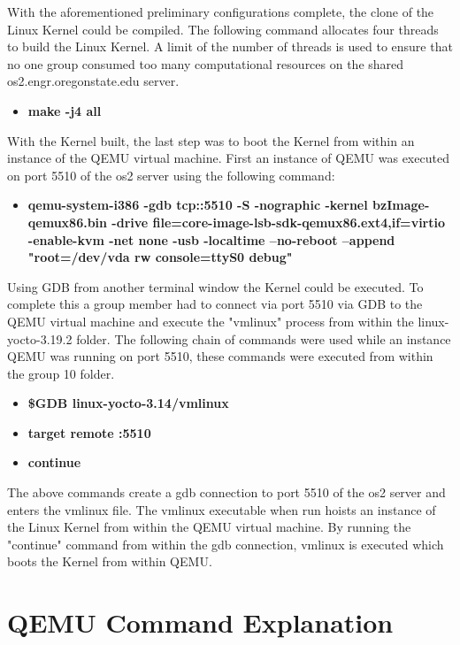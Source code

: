 \documentclass[10pt,onecolumn,draftclsnofoot]{IEEEtran} %
\begin{document}
\begin{singlespace}
 \normalfont \indent With the aforementioned preliminary configurations complete, the clone of the Linux Kernel could be compiled. The following command allocates four threads to build the Linux Kernel. A limit of the number of threads is used to ensure that no one group consumed too many computational resources on the shared os2.engr.oregonstate.edu server.
  \begin{itemize}
    \item \textbf{make -j4 all}
  \end{itemize}
  \normalfont \indent With the Kernel built, the last step was to boot the Kernel from within an instance of the QEMU virtual machine. First an instance of QEMU was executed on port 5510 of the os2 server using the following command:
  \begin{itemize}
    \item \textbf{qemu-system-i386 -gdb tcp::5510 -S -nographic -kernel bzImage-qemux86.bin -drive file=core-image-lsb-sdk-qemux86.ext4,if=virtio -enable-kvm -net none -usb -localtime --no-reboot --append "root=/dev/vda rw console=ttyS0 debug"}
  \end{itemize}
  \normalfont \indent Using GDB from another terminal window the Kernel could be executed. To complete this a group member had to connect via port 5510 via GDB to the QEMU virtual machine and execute the "vmlinux" process from within the linux-yocto-3.19.2 folder. The following chain of commands were used while an instance QEMU was running on port 5510, these commands were executed from within the group 10 folder.

  \begin{itemize}
    \item \textbf{\$GDB linux-yocto-3.14/vmlinux}
    \item \textbf{target remote :5510}
    \item \textbf{continue}
  \end{itemize}

  \normalfont \indent The above commands create a gdb connection to port 5510 of the os2 server and enters the vmlinux file. The vmlinux executable when run hoists an instance of the Linux Kernel from within the QEMU virtual machine. By running the "continue" command from within the gdb connection, vmlinux is executed which boots the Kernel from within QEMU.


\newpage
\section{\bf  QEMU Command Explanation}


\end{singlespace}
\end{document}
